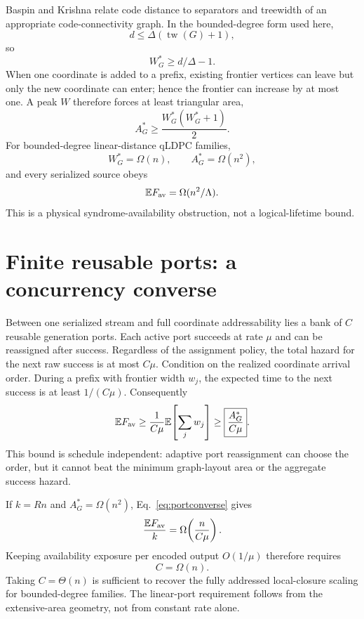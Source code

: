 \documentclass[aps,prx,reprint,superscriptaddress,nofootinbib,longbibliography,floatfix]{revtex4-2}
\newcommand{\E}{\mathbb E}\newcommand{\Prob}{\mathbb P}
\begin{document}
Baspin and Krishna relate code distance to separators and treewidth of an appropriate code-connectivity graph. In the bounded-degree form used here,
\begin{equation}
d\le\Delta(\operatorname{tw}(G)+1),
\end{equation}
so
\begin{equation}
W_G^*\ge d/\Delta-1.
\end{equation}
When one coordinate is added to a prefix, existing frontier vertices can leave but only the new coordinate can enter; hence the frontier can increase by at most one. A peak $W$ therefore forces at least triangular area,
\begin{equation}
A_G^*\ge\frac{W_G^*(W_G^*+1)}2.
\end{equation}
For bounded-degree linear-distance qLDPC families,
\begin{equation}
W_G^*=\Omega(n),\qquad A_G^*=\Omega(n^2),
\end{equation}
and every serialized source obeys
\begin{equation}
\E F_{\rm av}=\Omega(n^2/\Lambda).
\end{equation}
This is a physical syndrome-availability obstruction, not a logical-lifetime bound.

\section{Finite reusable ports: a concurrency converse}
Between one serialized stream and full coordinate addressability lies a bank of $C$ reusable generation ports. Each active port succeeds at rate $\mu$ and can be reassigned after success. Regardless of the assignment policy, the total hazard for the next raw success is at most $C\mu$. Condition on the realized coordinate arrival order. During a prefix with frontier width $w_j$, the expected time to the next success is at least $1/(C\mu)$. Consequently
\begin{equation}
\E F_{\rm av}\ge \frac{1}{C\mu}\E\!\left[\sum_j w_j\right]
\ge\boxed{\frac{A_G^*}{C\mu}}.
\label{eq:portconverse}
\end{equation}
This bound is schedule independent: adaptive port reassignment can choose the order, but it cannot beat the minimum graph-layout area or the aggregate success hazard.

If $k=Rn$ and $A_G^*=\Omega(n^2)$, Eq.~\eqref{eq:portconverse} gives
\begin{equation}
\frac{\E F_{\rm av}}{k}=\Omega\!\left(\frac{n}{C\mu}\right).
\end{equation}
Keeping availability exposure per encoded output $O(1/\mu)$ therefore requires
\begin{equation}
\boxed{C=\Omega(n)}.
\end{equation}
Taking $C=\Theta(n)$ is sufficient to recover the fully addressed local-closure scaling for bounded-degree families. The linear-port requirement follows from the extensive-area geometry, not from constant rate alone.
\end{document}
